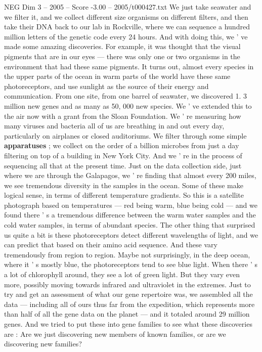 \begin{textsample}{NEG Dim 3 – 2005 – Score -3.00 – 2005/t000427.txt}
We just take seawater and we filter it, and we collect different size organisms on different filters, and then take their DNA back to our lab in Rockville, where we can sequence a hundred million letters of the genetic code every 24 hours.
And with doing this, we ' ve made some amazing discoveries.
For example, it was thought that the visual pigments that are in our eyes — there was only one or two organisms in the environment that had these same pigments.
It turns out, almost every species in the upper parts of the ocean in warm parts of the world have these same photoreceptors, and use sunlight as the source of their energy and communication.
From one site, from one barrel of seawater, we discovered 1. 3 million new genes and as many as 50, 000 new species.
We ' ve extended this to the air now with a grant from the Sloan Foundation.
We ' re measuring how many viruses and bacteria all of us are breathing in and out every day, particularly on airplanes or closed auditoriums.
We filter through some simple \textbf{apparatuses} ; we collect on the order of a billion microbes from just a day filtering on top of a building in New York City.
And we ' re in the process of sequencing all that at the present time.
Just on the data collection side, just where we are through the Galapagos, we ' re finding that almost every 200 miles, we see tremendous diversity in the samples in the ocean.
Some of these make logical sense, in terms of different temperature gradients.
So this is a satellite photograph based on temperatures — red being warm, blue being cold — and we found there ' s a tremendous difference between the warm water samples and the cold water samples, in terms of abundant species.
The other thing that surprised us quite a bit is these photoreceptors detect different wavelengths of light, and we can predict that based on their amino acid sequence.
And these vary tremendously from region to region.
Maybe not surprisingly, in the deep ocean, where it ' s mostly blue, the photoreceptors tend to see blue light.
When there ' s a lot of chlorophyll around, they see a lot of green light.
But they vary even more, possibly moving towards infrared and ultraviolet in the extremes.
Just to try and get an assessment of what our gene repertoire was, we assembled all the data — including all of ours thus far from the expedition, which represents more than half of all the gene data on the planet — and it totaled around 29 million genes.
And we tried to put these into gene families to see what these discoveries are : Are we just discovering new members of known families, or are we discovering new families?

\end{textsample}
